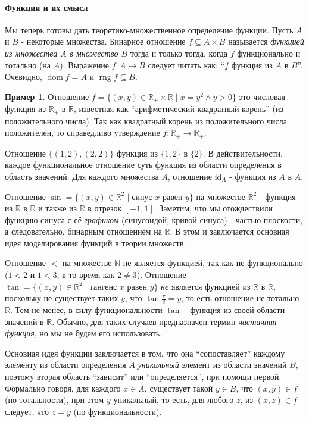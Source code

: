 \documentclass[12pt,notitlepage]{article}
\theoremstyle{plain}
\theoremstyle{definition}
\newtheorem{exm}[thm]{Пример}
\theoremstyle{plain}
\newcommand{\N}{\mathbb{N}}
\newcommand{\R}{\mathbb{R}}
\newcommand{\sbs}{\subseteq}
\newcommand{\dom}{\mathop{\mathrm{dom}}}
\newcommand{\rng}{\mathop{\mathrm{rng}}}
\newcommand{\id}{\mathrm{id}}
\newcommand{\1}{\mathbf{1}}
\newcommand{\0}{\mathbf{0}}
\begin{document}
\paragraph{Функции и их смысл} Мы теперь готовы дать теоретико-множественное определение функции. Пусть  $A$ и $B$ - некоторые множества. Бинарное отношение $f \sbs A \times B$ называется \emph{функцией из множества $A$ в множество $B$} тогда и только тогда, когда $f$ функционально и тотально (на $A$). Выражение $f\colon A \to B$ следует читать как: ``$f$ функция из $A$ в $B$''. Очевидно, $\dom f = A$ и $\rng f \sbs B$.

\begin{exm}
	Отношение $f = \{(x,y) \in \R_+ \times \R \mid x = y^2 \wedge y > 0 \}$ это числовая функция из $\R_+$ в $\R$, известная как ``арифметический квадратный корень'' (из положительного числа). Так как квадратный корень из положительного числа положителен, то справедливо утверждение $f\colon \R_+ \to \R_+$.
	
	Отношение $\{ (1,2), (2,2) \}$ функция из $\{1, 2\}$ в $\{2\}$. В действительности, каждое функциональное отношение суть функция из области определения в область значений. Для каждого множества $A$, отношение $\id_A$ - функция из $A$ в $A$.
	
	Отношение $\sin = \{ (x, y) \in \R^2 \mid \mbox{синус $x$ равен $y$} \}$ на множестве $\R^2$ - функция из $\R$ в $\R$ и также из $\R$ в отрезок $[-1, 1]$. Заметим, что мы отождествили функцию синуса с её \emph{графиком} (синусоидой, кривой синуса)---частью плоскости, а следовательно, бинарным отношением на $\R$. В этом и заключается основная идея моделирования функций в теории множеств.
	
	Отношение $<$ на множестве $\N$ не является функцией, так как не функционально ($1 < 2$ и $1 < 3$, в то время как $2 \neq 3$). Отношение $\tan = \{ (x, y) \in \R^2 \mid \mbox{тангенс $x$ равен $y$} \}$ \emph{не} является функцией из $\R$ в $\R$, поскольку не существует таких $y$, что $\tan \frac{\pi}{2} = y$, то есть отношение не тотально $\R$. Тем не менее, в силу функциональности $\tan$ - функция из своей области значений в $\R$. Обычно, для таких случаев предназначен термин \emph{частичная функция}, но мы не будем его использовать.
\end{exm}

Основная идея функции заключается в том, что  она ``сопоставляет'' каждому элементу из области определения $A$ \emph{уникальный} элемент из области значений $B$, поэтому вторая область ``зависит'' или ``определяется'', при помощи первой. Формально говоря, для каждого $x \in A$, существует такой $y \in B$, что $(x,y) \in f$ (по тотальности), при этом $y$ уникальный, то есть, для любого $z$, из $(x,z) \in f$ следует, что $z = y$ (по функциональности).
\end{document}
